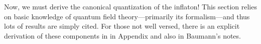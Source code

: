 

Now, we must derive the canonical quantization of the inflaton! This section relies on basic knowledge of quantum field theory—primarily its formalism—and thus lots of results are simply cited. For those not well versed, there is an explicit derivation of these components in in Appendix  and also in Baumann's notes.



